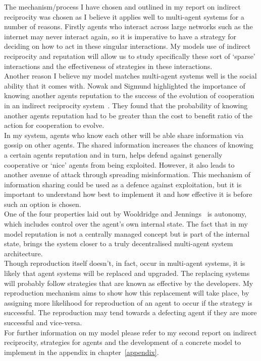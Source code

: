\documentclass[]{final_report}
\begin{document}
The mechanism/process I have chosen and outlined in my report on indirect reciprocity was chosen as I believe it applies well to multi-agent systems for a number of reasons. Firstly agents who interact across large networks such as the internet may never interact again, so it is imperative to have a strategy for deciding on how to act in these singular interactions. My models use of indirect reciprocity and reputation will allow us to study specifically these sort of `sparse' interactions and the effectiveness of strategies in these interactions.\\
Another reason I believe my model matches multi-agent systems well is the social ability that it comes with. Nowak and Sigmund highlighted the importance of knowing another agents reputation to the success of the evolution of cooperation in an indirect reciprocity system~\cite{evol_indirect_image}. They found that the probability of knowing another agents reputation had to be greater than the cost to benefit ratio of the action for cooperation to evolve.\\
In my system, agents who know each other will be able share information via gossip on other agents. The shared information increases the chances of knowing a certain agents reputation and in turn, helps defend against generally cooperative or `nice' agents from being exploited. However, it also leads to another avenue of attack through spreading misinformation. This mechanism of information sharing could be used as a defence against exploitation, but it is important to understand how best to implement it and how effective it is before such an option is chosen.\\
One of the four properties laid out by Wooldridge and Jennings~\cite{wooldridge_jennings_1995} is autonomy, which includes control over the agent's own internal state. The fact that in my model reputation is not a centrally managed concept but is part of the internal state, brings the system closer to a truly decentralised multi-agent system architecture.\\
Though reproduction itself doesn't, in fact, occur in multi-agent systems, it is likely that agent systems will be replaced and upgraded. The replacing systems will probably follow strategies that are known as effective by the developers. My reproduction mechanism aims to show how this replacement will take place, by assigning more likelihood for reproduction of an agent to occur if the strategy is successful. The reproduction may tend towards a defecting agent if they are more successful and vice-versa.\\
For further information on my model please refer to my second report on indirect reciprocity, strategies for agents and the development of a concrete model to implement in the appendix in chapter~\ref{appendix}.
\end{document}
